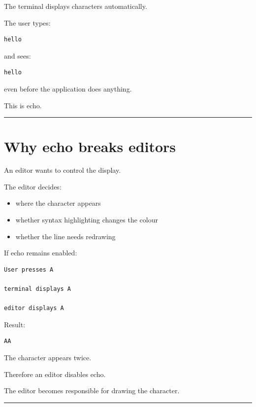 \documentclass[
  oneside,
  openany]{book}
\providecommand{\tightlist}{%
  \setlength{\itemsep}{0pt}\setlength{\parskip}{0pt}}
\begin{document}
The terminal displays characters automatically.

The user types:

\begin{verbatim}
hello
\end{verbatim}

and sees:

\begin{verbatim}
hello
\end{verbatim}

even before the application does anything.

This is echo.

\begin{center}\rule{0.5\linewidth}{0.5pt}\end{center}

\hypertarget{why-echo-breaks-editors}{%
\section{Why echo breaks editors}\label{why-echo-breaks-editors}}

An editor wants to control the display.

The editor decides:

\begin{itemize}
\tightlist
\item
  where the character appears
\item
  whether syntax highlighting changes the colour
\item
  whether the line needs redrawing
\end{itemize}

If echo remains enabled:

\begin{verbatim}
User presses A

terminal displays A

editor displays A
\end{verbatim}

Result:

\begin{verbatim}
AA
\end{verbatim}

The character appears twice.

Therefore an editor disables echo.

The editor becomes responsible for drawing the character.

\begin{center}\rule{0.5\linewidth}{0.5pt}\end{center}
\end{document}
